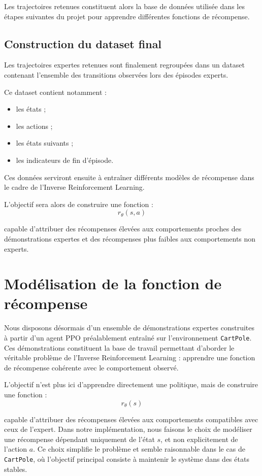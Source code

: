 Les trajectoires retenues constituent alors la base de données utilisée dans les étapes suivantes du projet pour apprendre différentes fonctions de récompense.

\subsection{Construction du dataset final}

Les trajectoires expertes retenues sont finalement regroupées dans un dataset contenant l’ensemble des transitions observées lors des épisodes experts.

Ce dataset contient notamment :
\begin{itemize}
    \item les états ;
    \item les actions ;
    \item les états suivants ;
    \item les indicateurs de fin d’épisode.
\end{itemize}

Ces données serviront ensuite à entraîner différents modèles de récompense dans le cadre de l’Inverse Reinforcement Learning.

L’objectif sera alors de construire une fonction :
\[
r_\theta(s,a)
\]

capable d’attribuer des récompenses élevées aux comportements proches des démonstrations expertes et des récompenses plus faibles aux comportements non experts.

\section{Modélisation de la fonction de récompense}

Nous disposons désormais d’un ensemble de démonstrations expertes construites à partir d’un agent PPO préalablement entraîné sur l’environnement \texttt{CartPole}. Ces démonstrations constituent la base de travail permettant d’aborder le véritable problème de l’Inverse Reinforcement Learning : apprendre une fonction de récompense cohérente avec le comportement observé.

L’objectif n’est plus ici d’apprendre directement une politique, mais de construire une fonction :
\[
r_\theta(s)
\]

capable d’attribuer des récompenses élevées aux comportements compatibles avec ceux de l’expert. Dans notre implémentation, nous faisons le choix de modéliser une récompense dépendant uniquement de l’état \(s\), et non explicitement de l’action \(a\). Ce choix simplifie le problème et semble raisonnable dans le cas de \texttt{CartPole}, où l’objectif principal consiste à maintenir le système dans des états stables.

